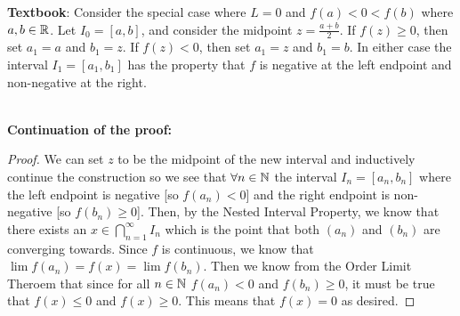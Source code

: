 \documentclass[12pt,letterpaper]{article}
\begin{document}
\begin{itemize}[leftmargin=!,labelindent=5pt]
            \textbf{Textbook}: 
                Consider the special case where $L = 0$ and $f(a) < 0 < f(b)$ where $a,b \in \mathbb{R}$.
                Let $I_0 = [a,b]$, and consider the midpoint $z = \frac{a+b}{2}$.
                If $f(z) \geq 0$, then set $a_1 = a$ and $b_1 = z$. 
                If $f(z) < 0$, then set $a_1 = z$ and $b_1 = b$.
                In either case the interval $I_1 = [a_1, b_1]$ has the property that $f$ is negative at the left endpoint and non-negative at the right.
            
            \ \\
            \textbf{Continuation of the proof:} 
            \begin{proof}
                We can set $z$ to be the midpoint of the new interval and inductively continue the construction so we see that $\forall n \in \mathbb{N}$ the interval $I_n = [a_n, b_n]$ where the left endpoint is negative [so $f(a_n) < 0$] and the right endpoint is non-negative [so $f(b_n) \geq 0$].
                Then, by the Nested Interval Property, we know that there exists an $x \in \bigcap_{n=1}^{\infty}I_n$ which is the point that both $(a_n)$ and $(b_n)$ are converging towards.
                Since $f$ is continuous, we know that $\lim f(a_n) = f(x) = \lim f(b_n)$.
                Then we know from the Order Limit Theroem that since for all $n \in \mathbb{N}$ $f(a_n) < 0$ and $f(b_n) \geq 0$, it must be true that $f(x) \leq 0$ and $f(x) \geq 0$. 
                This means that $f(x) = 0$ as desired.
            \end{proof}
    \end{itemize}
\end{document}
